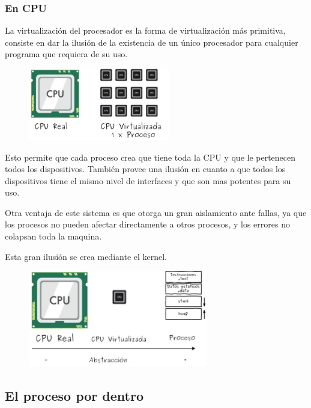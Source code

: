 \documentclass[titlepage,a4paper]{article}
\begin{document}
\subsubsection*{En CPU}
La virtualización del procesador es la forma de virtualización más primitiva, consiste en dar la ilusión de la existencia de un único procesador para cualquier programa que requiera de su uso.

\begin{figure}[!htb]
    \centering
    \includegraphics[width=0.55\textwidth]{ImagenesApunte/virtualizacionCpu.jpg}
\end{figure}

Esto permite que cada proceso crea que tiene toda la CPU y que le pertenecen todos los dispositivos. También provee una ilusión en cuanto a que todos los dispositivos tiene el mismo nivel de interfaces y que son mas potentes para su uso.

Otra ventaja de este sistema es que otorga un gran aislamiento ante fallas, ya que los procesos no pueden afectar directamente a otros procesos, y los errores no colapsan toda la maquina.

Esta gran ilusión se crea mediante el kernel.

\begin{figure}[!htb]
    \centering
    \includegraphics[width=0.7\textwidth]{ImagenesApunte/cpuvirtualizacion2.jpg}
\end{figure}

\subsection*{El proceso por dentro}
\end{document}
